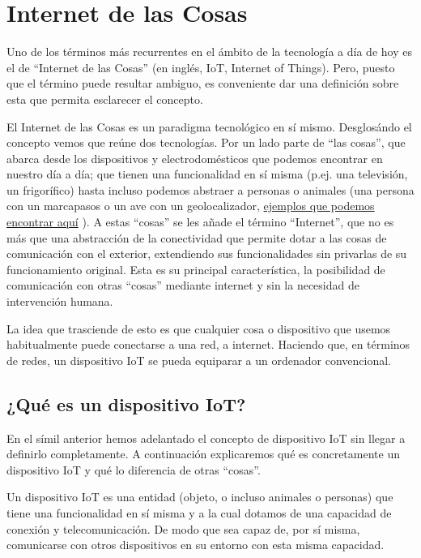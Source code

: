 \documentclass[a4paper,10pt]{article}
\begin{document}
\section{Internet de las Cosas}\label{internet-de-las-cosas}

Uno de los términos más recurrentes en el ámbito de la tecnología a día
de hoy es el de ``Internet de las Cosas'' (en inglés, IoT, Internet of
Things). Pero, puesto que el término puede resultar ambiguo, es
conveniente dar una definición sobre esta que permita esclarecer el
concepto.

El Internet de las Cosas es un paradigma tecnológico en sí mismo.
Desglosándo el concepto vemos que reúne dos tecnologías. Por un lado
parte de ``las cosas'', que abarca desde los dispositivos y
electrodomésticos que podemos encontrar en nuestro día a día; que tienen
una funcionalidad en sí misma (p.ej. una televisión, un frigorífico)
hasta incluso podemos abstraer a personas o animales (una persona con un
marcapasos o un ave con un geolocalizador,
\href{https://internetofthingsagenda.techtarget.com/definition/Internet-of-Things-IoT}{ejemplos que podemos encontrar aquí}
). A estas ``cosas'' se les añade el término
``Internet'', que no es más que una abstracción de la conectividad que
permite dotar a las cosas de comunicación con el exterior, extendiendo
sus funcionalidades sin privarlas de su funcionamiento original. Esta es
su principal característica, la posibilidad de comunicación con otras
``cosas'' mediante internet y sin la necesidad de intervención humana.

La idea que trasciende de esto es que cualquier cosa o dispositivo que
usemos habitualmente puede conectarse a una red, a internet. Haciendo
que, en términos de redes, un dispositivo IoT se pueda equiparar a un
ordenador convencional.

\subsection{¿Qué es un dispositivo
IoT?}\label{quuxe9-es-un-dispositivo-iot}

En el símil anterior hemos adelantado el concepto de dispositivo IoT sin
llegar a definirlo completamente. A continuación explicaremos qué es
concretamente un dispositivo IoT y qué lo diferencia de otras ``cosas''.

Un dispositivo IoT es una entidad (objeto, o incluso animales o
personas) que tiene una funcionalidad en sí misma y a la cual dotamos de
una capacidad de conexión y telecomunicación. De modo que sea capaz de,
por sí misma, comunicarse con otros dispositivos en su entorno con esta
misma capacidad.
\end{document}
